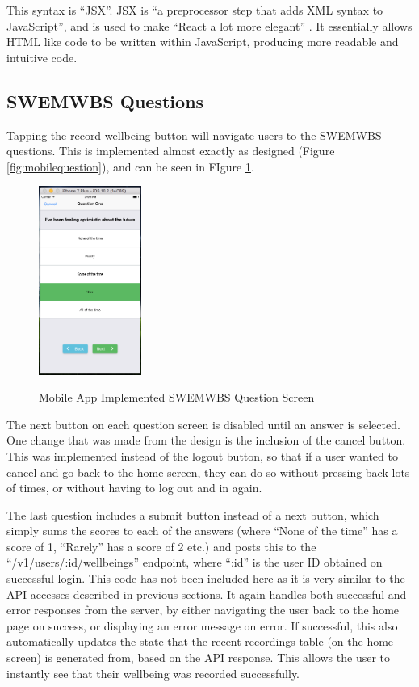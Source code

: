 \documentclass[11pt,openright,a4paper]{report}
\begin{document}
This syntax is \enquote{JSX}. JSX is \enquote{a preprocessor step that adds XML syntax to JavaScript}, and is used to make \enquote{React a lot more elegant} \parencite{jsx}. It essentially allows HTML like code to be written within JavaScript, producing more readable and intuitive code.

\subsection{SWEMWBS Questions}
Tapping the record wellbeing button will navigate users to the SWEMWBS questions. This is implemented almost exactly as designed (Figure \ref{fig:mobilequestion}), and can be seen in FIgure \ref{fig:mobilequestionimpl}.

\begin{figure}[ht]
\centering
\caption{Mobile App Implemented SWEMWBS Question Screen}
\includegraphics[width=0.3\textwidth]{i/mobilequestionimpl.png}
\label{fig:mobilequestionimpl}
\end{figure}

The next button on each question screen is disabled until an answer is selected. One change that was made from the design is the inclusion of the cancel button. This was implemented instead of the logout button, so that if a user wanted to cancel and go back to the home screen, they can do so without pressing back lots of times, or without having to log out and in again.

The last question includes a submit button instead of a next button, which simply sums the scores to each of the answers (where \enquote{None of the time} has a score of 1, \enquote{Rarely} has a score of 2 etc.) and posts this to the \enquote{/v1/users/:id/wellbeings} endpoint, where \enquote{:id} is the user ID obtained on successful login. This code has not been included here as it is very similar to the API accesses described in previous sections. It again handles both successful and error responses from the server, by either navigating the user back to the home page on success, or displaying an error message on error. If successful, this also automatically updates the state that the recent recordings table (on the home screen) is generated from, based on the API response. This allows the user to instantly see that their wellbeing was recorded successfully.
\end{document}
